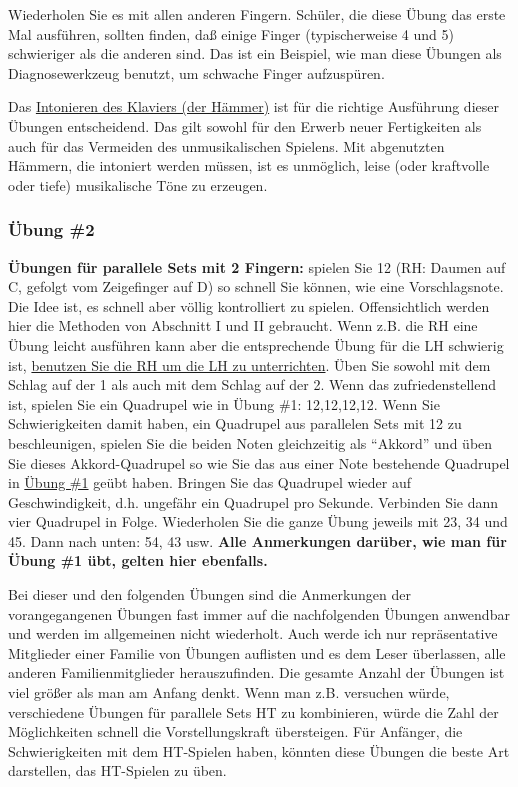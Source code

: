 Wiederholen Sie es mit allen anderen Fingern.
Schüler, die diese Übung das erste Mal ausführen, sollten finden, daß einige Finger (typischerweise 4 und 5) schwieriger als die anderen sind.
Das ist ein Beispiel, wie man diese Übungen als Diagnosewerkzeug benutzt, um schwache Finger aufzuspüren.

Das \hyperlink{c2_7_hamm}{Intonieren des Klaviers (der Hämmer)} ist für die richtige Ausführung dieser Übungen entscheidend.
Das gilt sowohl für den Erwerb neuer Fertigkeiten als auch für das Vermeiden des unmusikalischen Spielens.
Mit abgenutzten Hämmern, die intoniert werden müssen, ist es unmöglich, leise (oder kraftvolle oder tiefe) musikalische Töne zu erzeugen.


\subsubsection{Übung \#2}\hypertarget{c1iii7b2}{}

\textbf{Übungen für parallele Sets mit 2 Fingern:} spielen Sie 12 (RH: Daumen auf C, gefolgt vom Zeigefinger auf D) so schnell Sie können, wie eine Vorschlagsnote.
Die Idee ist, es schnell aber völlig kontrolliert zu spielen.
Offensichtlich werden hier die Methoden von Abschnitt I und II gebraucht.
Wenn z.B. die RH eine Übung leicht ausführen kann aber die entsprechende Übung für die LH schwierig ist, \hyperlink{c1ii20}{benutzen Sie die RH um die LH zu unterrichten}.
Üben Sie sowohl mit dem Schlag auf der 1 als auch mit dem Schlag auf der 2.
Wenn das zufriedenstellend ist, spielen Sie ein Quadrupel wie in Übung \#1: 12,12,12,12.
Wenn Sie Schwierigkeiten damit haben, ein Quadrupel aus parallelen Sets mit 12 zu beschleunigen, spielen Sie die beiden Noten gleichzeitig als \enquote{Akkord} und üben Sie dieses Akkord-Quadrupel so wie Sie das aus einer Note bestehende Quadrupel in \hyperlink{c1iii7b1}{Übung \#1} geübt haben.
Bringen Sie das Quadrupel wieder auf Geschwindigkeit, d.h. ungefähr ein Quadrupel pro Sekunde.
Verbinden Sie dann vier Quadrupel in Folge.
Wiederholen Sie die ganze Übung jeweils mit 23, 34 und 45.
Dann nach unten: 54, 43 usw.
\textbf{Alle Anmerkungen darüber, wie man für Übung \#1 übt, gelten hier ebenfalls.}

Bei dieser und den folgenden Übungen sind die Anmerkungen der vorangegangenen Übungen fast immer auf die nachfolgenden Übungen anwendbar und werden im allgemeinen nicht wiederholt.
Auch werde ich nur repräsentative Mitglieder einer Familie von Übungen auflisten und es dem Leser überlassen, alle anderen Familienmitglieder herauszufinden.
Die gesamte Anzahl der Übungen ist viel größer als man am Anfang denkt.
Wenn man z.B. versuchen würde, verschiedene Übungen für parallele Sets HT zu kombinieren, würde die Zahl der Möglichkeiten schnell die Vorstellungskraft übersteigen.
Für Anfänger, die Schwierigkeiten mit dem HT-Spielen haben, könnten diese Übungen die beste Art darstellen, das HT-Spielen zu üben.

